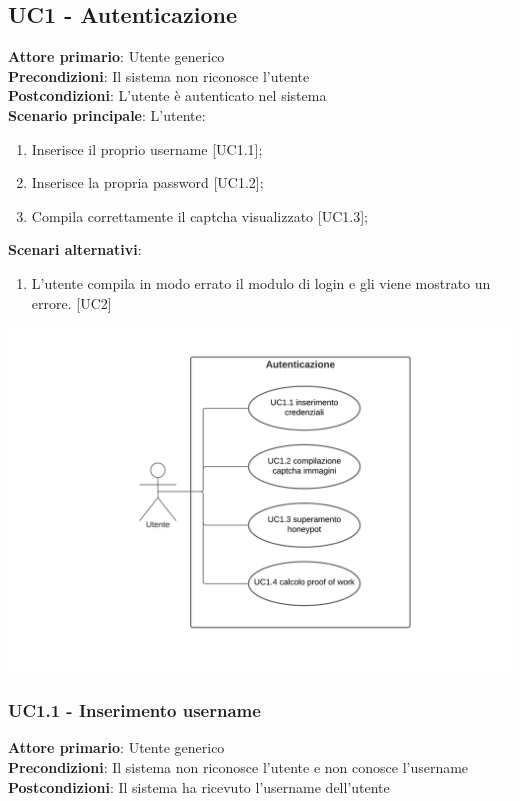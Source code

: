 \subsection{UC1 - Autenticazione}
\textbf{Attore primario}: Utente generico\\
\textbf{Precondizioni}: Il sistema non riconosce l'utente\\
\textbf{Postcondizioni}: L'utente è autenticato nel sistema\\

\textbf{Scenario principale}: L'utente:
\begin{enumerate}
\item Inserisce il proprio username [UC1.1];
\item Inserisce la propria password [UC1.2];
\item Compila correttamente il captcha visualizzato [UC1.3];
\end{enumerate}

\textbf{Scenari alternativi}:
\begin{enumerate}
    \item L’utente compila in modo errato il modulo di login e gli viene mostrato un errore. [UC2]
\end{enumerate}

\begin{center}
	\includegraphics[scale = 1]{img/Autenticazione.png}\\
\end{center}

\subsubsection{UC1.1 - Inserimento username}
\textbf{Attore primario}: Utente generico\\
\textbf{Precondizioni}: Il sistema non riconosce l'utente e non conosce l'username\\
\textbf{Postcondizioni}: Il sistema ha ricevuto l'username dell'utente\\

